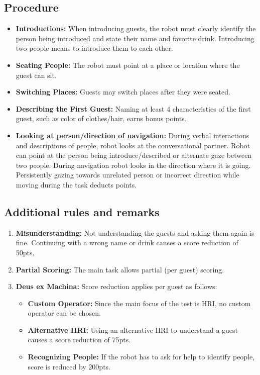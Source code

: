 \subsection*{Procedure}
\begin{itemize}
    \item \textbf{Introductions:} When introducing guests, the robot must clearly identify the person being introduced and state their name and favorite drink. Introducing two people means to introduce them to each other.
	
	\item \textbf{Seating People:} The robot must point at a place or location where the guest can sit.
	
	\item \textbf{Switching Places:} Guests may switch places after they were seated.
	
	\item \textbf{Describing the First Guest:} Naming at least 4 characteristics of the first guest, such as color of clothes/hair, earns bonus points.
	\item \textbf{Looking at person/direction of navigation:} During verbal interactions and descriptions of people, robot 
	looks at the conversational partner. Robot can point at the person being introduce/described or alternate gaze between two people. During navigation robot looks in the direction where it is going. Persistently gazing towards unrelated 
	person or incorrect direction while moving during the task deducts points. 
\end{itemize}

\subsection*{Additional rules and remarks}
\begin{enumerate}[nosep]
	\item \textbf{Misunderstanding:} Not understanding the guests and asking them again is fine. Continuing with a wrong name or drink causes a score reduction of 50pts.
		
	\item \textbf{Partial Scoring:} The main task allows partial (per guest) scoring.
	
	\item \textbf{Deus ex Machina:} Score reduction applies per guest as follows:
	\begin{itemize}[nosep]
		\item \textbf{Custom Operator:} Since the main focus of the test is HRI, no custom operator can be chosen.
		\item \textbf{Alternative HRI:} Using an alternative HRI to understand a guest causes a score reduction of 75pts.
		\item \textbf{Recognizing People:} If the robot has to ask for help to identify people, score is reduced by 200pts. 
	\end{itemize}
\end{enumerate}


